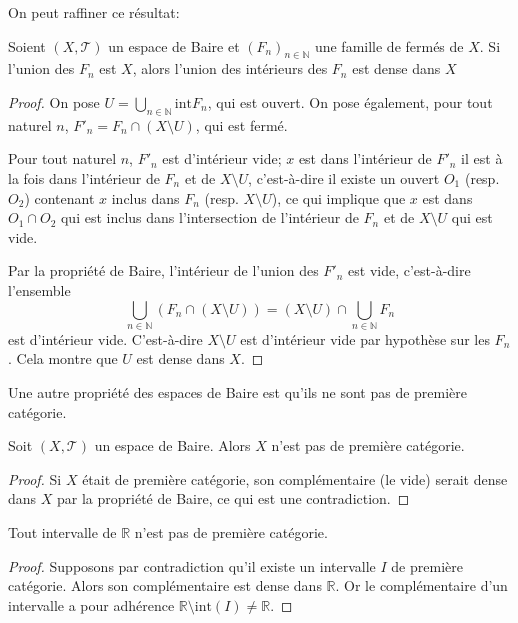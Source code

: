 On peut raffiner ce résultat:
\begin{prop}
  Soient $(X, \mathcal{T})$ un espace de Baire et $(F_n)_{n\in\mathbb N}$
  une famille de fermés de $X$. Si l'union des $F_n$ est $X$,
  alors l'union des intérieurs des $F_n$ est dense dans $X$
\end{prop}

\begin{proof}
  On pose $U = \bigcup_{n\in\mathbb N} \mathrm{int}F_n$, qui est
  ouvert. On pose également, pour tout naturel $n$,
  $F'_n = F_n\cap (X\setminus U)$, qui est fermé.

  Pour tout naturel $n$, $F'_n$ est d'intérieur vide; $x$ est dans
  l'intérieur de $F'_n$ \ssi{} il est à la fois dans l'intérieur de
  $F_n$ et de $X\setminus U$, c'est-à-dire il existe un ouvert $O_1$
  (resp. $O_2$) contenant $x$ inclus dans $F_n$ (resp. $X\setminus U$),
  ce qui implique que $x$ est dans $O_1\cap O_2$ qui est inclus dans
  l'intersection de l'intérieur de $F_n$ et de $X\setminus U$ qui est vide.

  Par la propriété de Baire, l'intérieur de l'union des $F'_n$ est vide,
  c'est-à-dire l'ensemble
  $$\bigcup_{n\in\mathbb N} \left(F_n \cap (X\setminus U)\right) =
  (X\setminus U)\cap \bigcup_{n\in\mathbb N} F_n$$
  est d'intérieur vide. C'est-à-dire $X\setminus U$ est d'intérieur vide
  par hypothèse sur les $F_n$. Cela montre que
  $U$ est dense dans $X$.
\end{proof}

Une autre propriété des espaces de Baire est qu'ils ne sont pas de première
catégorie.
\begin{prop}
  Soit $(X, \mathcal T)$ un espace de Baire. Alors $X$ n'est pas de
  première catégorie.
\end{prop}
\begin{proof}
  Si $X$ était de première catégorie, son complémentaire (le vide) serait
  dense dans $X$ par la propriété de Baire, ce qui est une contradiction.
\end{proof}

\begin{prop}
  Tout intervalle de $\mathbb R$ n'est pas de première catégorie.
\end{prop}
\begin{proof}
  Supposons par contradiction qu'il existe un intervalle $I$
  de première catégorie. Alors son complémentaire est dense dans
  $\mathbb R$. Or le complémentaire d'un intervalle a pour
  adhérence $\mathbb R\setminus \mathrm{int}(I)\neq \mathbb R$.
\end{proof}


